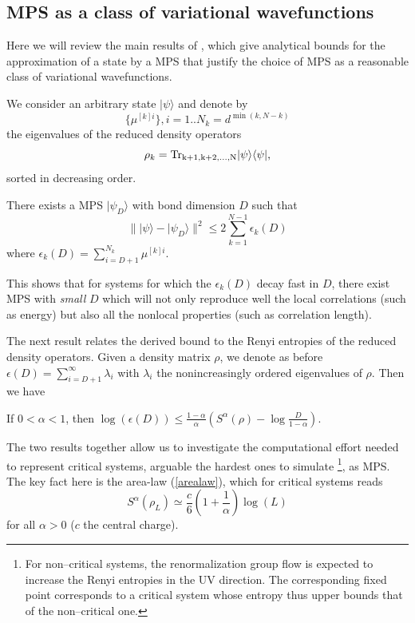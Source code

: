 \documentclass[aps,prl,epsfig,graphics,floatfix,mathbbm,a4paper]{article}
\newcommand{\1}{\mathbbm{1}}
\renewcommand{\>}{\rangle}
\newcommand{\<}{\langle}
\begin{document}
\subsection{MPS as a class of variational wavefunctions} \label{Sec:approx}


Here we will review the main results of \cite{VeCi05}, which give
analytical bounds for the approximation of a state by a MPS that
justify the choice of MPS as a reasonable class of variational
wavefunctions.

We consider an arbitrary state $|\psi\rangle$ and denote by
\[\{\mu^{[k]i}\}, i=1..N_k=d^{\min(k,N-k)}\] the eigenvalues of
the reduced density operators
\[\rho_k=\rm{Tr}_{k+1,k+2,\ldots
        ,N}|\psi\rangle\langle\psi|,\] sorted in decreasing order.

\begin{theorem}
    There exists a MPS $|\psi_D\rangle$ with bond dimension $D$ such
    that
    \[\||\psi\rangle-|\psi_D\rangle\|^2\leq
        2\sum_{k=1}^{N-1}\epsilon_k(D)
    \]
    where $\epsilon_k(D)=\sum_{i=D+1}^{N_k}\mu^{[k]i}$.
\end{theorem}

This shows that for systems for which the $\epsilon_k(D)$ decay
fast in $D$, there exist MPS with \emph{small} $D$ which will not
only reproduce well the local correlations (such as energy) but
also all the nonlocal properties (such as correlation length).

The next result relates the derived bound to the Renyi entropies
of the reduced density operators. Given a density matrix $\rho$,
we denote as before $\epsilon(D)=\sum_{i=D+1}^\infty\lambda_i$
with $\lambda_i$ the nonincreasingly ordered eigenvalues of
$\rho$. Then we have

\begin{theorem}
    If $0<\alpha<1$, then $\log(\epsilon(D))\leq
        \frac{1-\alpha}{\alpha}\left(S^\alpha(\rho)-\log\frac{D}{1-\alpha}\right)$.
\end{theorem}

The two results together allow us to investigate the computational
effort needed to represent critical  systems, arguable the hardest
ones to simulate \footnote{For non--critical systems, the
    renormalization group flow is expected to increase the Renyi
    entropies in the UV direction. The corresponding fixed point
    corresponds to a critical system whose entropy thus upper bounds
    that of the non--critical one.}, as MPS. The key fact here is the
area-law (\ref{arealaw}), which for critical systems reads
\begin{equation}
    S^\alpha(\rho_L)\simeq\frac{c}{6}
    \left(1+\frac{1}{\alpha}\right)\log(L)\label{infg}
\end{equation}
for all $\alpha>0$ ($c$ the central charge).
\end{document}
